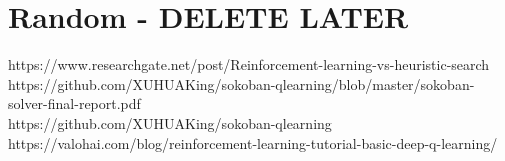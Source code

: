 \documentclass{article}
\begin{document}
\section{Random - DELETE LATER}
https://www.researchgate.net/post/Reinforcement-learning-vs-heuristic-search \\
https://github.com/XUHUAKing/sokoban-qlearning/blob/master/sokoban-solver-final-report.pdf \\
https://github.com/XUHUAKing/sokoban-qlearning \\
https://valohai.com/blog/reinforcement-learning-tutorial-basic-deep-q-learning/
\end{document}
